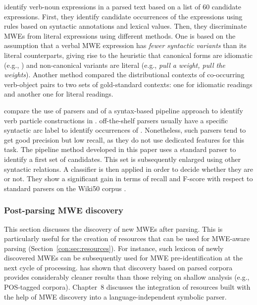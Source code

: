 \documentclass[output=paper]{langsci/langscibook}
\begin{document}
\citet{fazly-cook-stevenson:2009:cl} identify verb-noun expressions in a parsed text based on a list of 60 candidate expressions. First, they identify candidate occurrences of the expressions using rules based on syntactic annotations and lexical values. Then, they discriminate  MWEs from literal expressions using different methods. One is based on the assumption that a verbal MWE expression has \emph{fewer syntactic variants} than its literal counterparts, giving rise to the heuristic that canonical forms are idiomatic (e.g., ) and non-canonical variants are literal (e.g., \textit{pull a weight, pull the weights}). Another method
compared the distributional contexts of co-occurring verb-object pairs to two sets of gold-standard contexts: one for idiomatic readings and another one for literal readings. 

\citet{nagyt-vincze:2014:mwe} compare the use of parsers and of a syntax-based pipeline approach to identify verb particle constructions in .  off-the-shelf parsers usually have a specific syntactic arc label to identify occurrences of . Nonetheless, such parsers tend to get good precision but low recall, as they do not use dedicated features for this task. The pipeline method developed in this paper  uses a standard parser to identify a first set of candidates. This set is subsequently enlarged using other syntactic relations. A classifier is then applied in order to decide whether they are  or not. They show a significant gain in terms of recall and F-score with respect to standard parsers on the Wiki50 corpus \citep{vincze11}.

\subsubsection{Post-parsing MWE discovery}
\label{con:ssec:discopost}


{This section discusses the discovery of new MWEs after parsing. This is particularly useful for the creation of resources that can be used for MWE-aware parsing (Section~\ref{con:sec:resources}). 
For instance, such lexicon of newly discovered MWEs can be subsequently used for MWE pre-identification at the next cycle of processing.
\citet{seretan11} has shown that discovery based on parsed corpora provides considerably cleaner {results than those relying on shallow analysis (e.g., POS-tagged corpora)}. Chapter~8 discusses the integration of resources built with the help of MWE discovery into a language-independent symbolic parser.}
\end{document}
